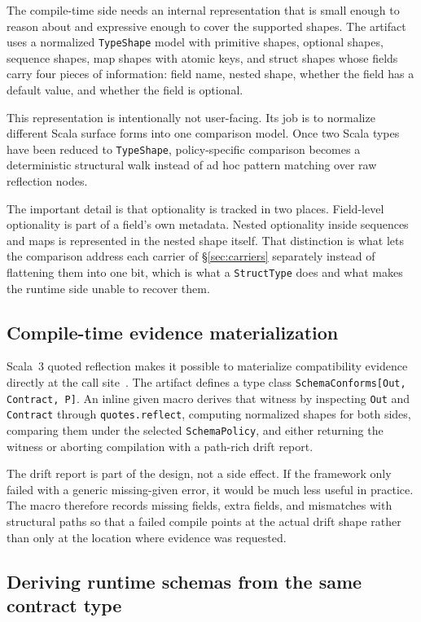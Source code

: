 The compile-time side needs an internal representation that is small enough to reason about and expressive enough to cover the supported shapes. The artifact uses a normalized \texttt{TypeShape} model with primitive shapes, optional shapes, sequence shapes, map shapes with atomic keys, and struct shapes whose fields carry four pieces of information: field name, nested shape, whether the field has a default value, and whether the field is optional.

This representation is intentionally not user-facing. Its job is to normalize different Scala surface forms into one comparison model. Once two Scala types have been reduced to \texttt{TypeShape}, policy-specific comparison becomes a deterministic structural walk instead of ad hoc pattern matching over raw reflection nodes.

The important detail is that optionality is tracked in two places. Field-level optionality is part of a field's own metadata. Nested optionality inside sequences and maps is represented in the nested shape itself. That distinction is what lets the comparison address each carrier of \S\ref{sec:carriers} separately instead of flattening them into one bit, which is what a \texttt{StructType} does and what makes the runtime side unable to recover them.

\subsection{Compile-time evidence materialization}

Scala~3 quoted reflection makes it possible to materialize compatibility evidence directly at the call site~\cite{scala3_reflection}. The artifact defines a type class \texttt{SchemaConforms[Out, Contract, P]}. An inline given macro derives that witness by inspecting \texttt{Out} and \texttt{Contract} through \texttt{quotes.reflect}, computing normalized shapes for both sides, comparing them under the selected \texttt{SchemaPolicy}, and either returning the witness or aborting compilation with a path-rich drift report.

The drift report is part of the design, not a side effect. If the framework only failed with a generic missing-given error, it would be much less useful in practice. The macro therefore records missing fields, extra fields, and mismatches with structural paths so that a failed compile points at the actual drift shape rather than only at the location where evidence was requested.

\subsection{Deriving runtime schemas from the same contract type}

